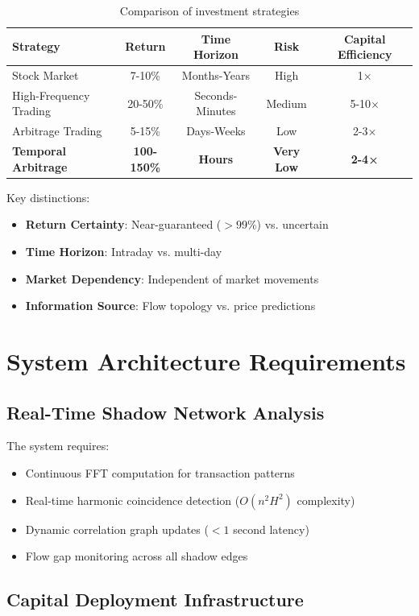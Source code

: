 \documentclass[12pt]{article}
\begin{document}
\begin{table}[h]
\centering
\begin{tabular}{|l|c|c|c|c|}
\hline
Strategy & Return & Time Horizon & Risk & Capital Efficiency \\
\hline
Stock Market & 7-10\% & Months-Years & High & 1× \\
High-Frequency Trading & 20-50\% & Seconds-Minutes & Medium & 5-10× \\
Arbitrage Trading & 5-15\% & Days-Weeks & Low & 2-3× \\
\textbf{Temporal Arbitrage} & \textbf{100-150\%} & \textbf{Hours} & \textbf{Very Low} & \textbf{2-4×} \\
\hline
\end{tabular}
\caption{Comparison of investment strategies}
\end{table}

Key distinctions:
\begin{itemize}
    \item \textbf{Return Certainty}: Near-guaranteed ($>99\%$) vs. uncertain
    \item \textbf{Time Horizon}: Intraday vs. multi-day
    \item \textbf{Market Dependency}: Independent of market movements
    \item \textbf{Information Source}: Flow topology vs. price predictions
\end{itemize}

\section{System Architecture Requirements}

\subsection{Real-Time Shadow Network Analysis}

The system requires:
\begin{itemize}
    \item Continuous FFT computation for transaction patterns
    \item Real-time harmonic coincidence detection ($O(n^2 H^2)$ complexity)
    \item Dynamic correlation graph updates ($<1$ second latency)
    \item Flow gap monitoring across all shadow edges
\end{itemize}

\subsection{Capital Deployment Infrastructure}
\end{document}
